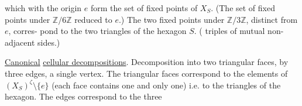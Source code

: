 
which with the origin $e$ form the set of fixed points of $X_S$.
(The set of fixed points under $\mathbb Z/6\mathbb Z$  reduced
to $e$.) The two fixed points under $\mathbb Z/3\mathbb Z$, distinct from $e$, corres-\newline
pond to the two  triangles of the hexagon $S$.
( triples of mutual non-adjacent sides.)

\uline{Canonical}\newline
\uline{cellular decompositions}. Decomposition into two triangular faces, by three edges,
a single vertex. The triangular faces correspond to the elements of
$(X_S)^\zeta\setminus\{e\}$ (each face contains one and only one) i.e.
to the  triangles of the hexagon. The edges correspond to the three

